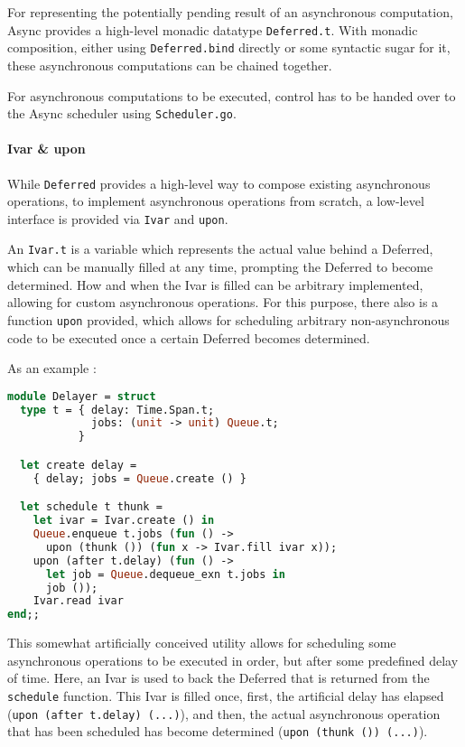\documentclass[a4paper,UKenglish,cleveref, autoref, thm-restate]{lipics-v2021}
\begin{document}
For representing the potentially pending result of an asynchronous computation, Async provides a high-level monadic datatype \verb|Deferred.t|. With monadic composition, either using \verb|Deferred.bind| directly or some syntactic sugar for it, these asynchronous computations can be chained together.

For asynchronous computations to be executed, control has to be handed over to the Async scheduler using \verb|Scheduler.go|.

\paragraph*{Ivar \& upon}

While \verb|Deferred| provides a high-level way to compose existing asynchronous operations, to implement asynchronous operations from scratch, a low-level interface is provided via \verb|Ivar| and \verb|upon|.

An \verb|Ivar.t| is a variable which represents the actual value behind a Deferred, which can be manually filled at any time, prompting the Deferred to become determined. How and when the Ivar is filled can be arbitrary implemented, allowing for custom asynchronous operations. For this purpose, there also is a function \verb|upon| provided, which allows for scheduling arbitrary non-asynchronous code to be executed once a certain Deferred becomes determined.

As an example \cite{Concurre6:online}:

\begin{minipage}{\linewidth}
\begin{lstlisting}[language=Caml,caption={Delayer example},captionpos=t]
module Delayer = struct
  type t = { delay: Time.Span.t;
             jobs: (unit -> unit) Queue.t;
           }

  let create delay =
    { delay; jobs = Queue.create () }

  let schedule t thunk =
    let ivar = Ivar.create () in
    Queue.enqueue t.jobs (fun () ->
      upon (thunk ()) (fun x -> Ivar.fill ivar x));
    upon (after t.delay) (fun () ->
      let job = Queue.dequeue_exn t.jobs in
      job ());
    Ivar.read ivar
end;;
\end{lstlisting}
\end{minipage}

This somewhat artificially conceived utility allows for scheduling some asynchronous operations to be executed in order, but after some predefined delay of time. Here, an Ivar is used to back the Deferred that is returned from the \verb|schedule| function. This Ivar is filled once, first, the artificial delay has elapsed (\verb|upon (after t.delay) (...)|), and then, the actual asynchronous operation that has been scheduled has become determined (\verb|upon (thunk ()) (...)|).
\end{document}
